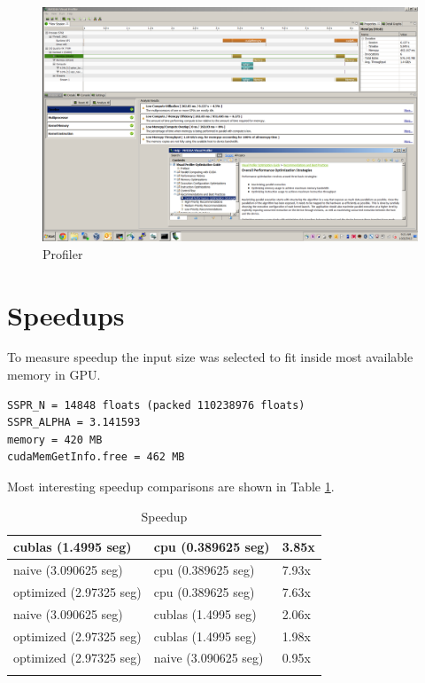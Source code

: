 \documentclass{llncs}
\begin{document}
\begin{figure}
\begin{center}
\includegraphics[width=\textwidth]{profiler.png}
\caption{Profiler}
\label{fig:profiler}
\end{center}
\end{figure}

\section{Speedups}

To measure speedup the input size was selected to fit inside most available memory in GPU.

\begin{verbatim}
SSPR_N = 14848 floats (packed 110238976 floats)
SSPR_ALPHA = 3.141593
memory = 420 MB
cudaMemGetInfo.free = 462 MB
\end{verbatim}

Most interesting speedup comparisons are shown in Table \ref{table:speedup}.

\begin{table}
\begin{center}
\begin{tabular} {|l|l|l|} \hline
cublas (1.4995 seg) & cpu (0.389625 seg) & 3.85x \\ \hline
naive (3.090625 seg) & cpu (0.389625 seg) & 7.93x \\ \hline
optimized (2.97325 seg) & cpu (0.389625 seg) & 7.63x \\ \hline
naive (3.090625 seg) & cublas (1.4995 seg) & 2.06x \\ \hline
optimized (2.97325 seg) & cublas (1.4995 seg) & 1.98x \\ \hline
optimized (2.97325 seg) & naive (3.090625 seg) & 0.95x \\ \hline
\label{table:speedup}
\end{tabular}
\end{center}
\caption{Speedup}
\end{table}
\end{document}
